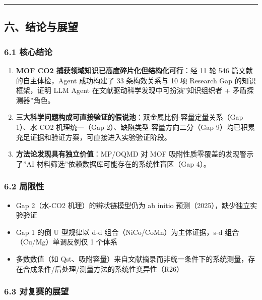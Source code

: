 \documentclass[12pt,a4paper]{ctexart}
\providecommand{\tightlist}{%
  \setlength{\itemsep}{0pt}\setlength{\parskip}{0pt}}
\begin{document}
\begin{center}\rule{0.5\linewidth}{0.5pt}\end{center}

\subsection{六、结论与展望}\label{ux516dux7ed3ux8bbaux4e0eux5c55ux671b}

\subsubsection{6.1 核心结论}\label{ux6838ux5fc3ux7ed3ux8bba}

\begin{enumerate}
\def\labelenumi{\arabic{enumi}.}
\item
  \textbf{MOF CO2 捕获领域知识已高度碎片化但结构化可行}：经 11 轮 546 篇文献的自主体检，Agent 成功构建了 33 条构效关系与 10 项 Research Gap 的知识框架，证明 LLM Agent 在文献驱动科学发现中可扮演''知识组织者 + 矛盾探测器''角色。
\item
  \textbf{三大科学问题构成可直接验证的假说池}：双金属比例-容量定量关系（Gap 1）、水-CO2 机理统一（Gap 2）、缺陷类型-容量方向二分（Gap 9）均已积累充足证据和验证方案，可直接进入实验验证阶段。
\item
  \textbf{方法论发现具有独立价值}：MP/OQMD 对 MOF 吸附性质零覆盖的发现警示了''AI 材料筛选''依赖数据库可能存在的系统性盲区（Gap 4）。
\end{enumerate}

\subsubsection{6.2 局限性}\label{ux5c40ux9650ux6027}

\begin{itemize}
\tightlist
\item
  Gap 2（水-CO2 机理）的辫状链模型仍为 ab initio 预测（2025），缺少独立实验验证
\item
  Gap 1 的倒 U 型规律以 d-d 组合（NiCo/CoMn）为主体证据，s-d 组合（Cu/Mg）单调反例仅 1 个体系
\item
  多数数值（如 Qst、吸附容量）来自文献摘录而非统一条件下的系统测量，存在合成条件/后处理/测量方法的系统性变异性（R26）
\end{itemize}

\subsubsection{6.3 对复赛的展望}\label{ux5bf9ux590dux8d5bux7684ux5c55ux671b}
\end{document}

